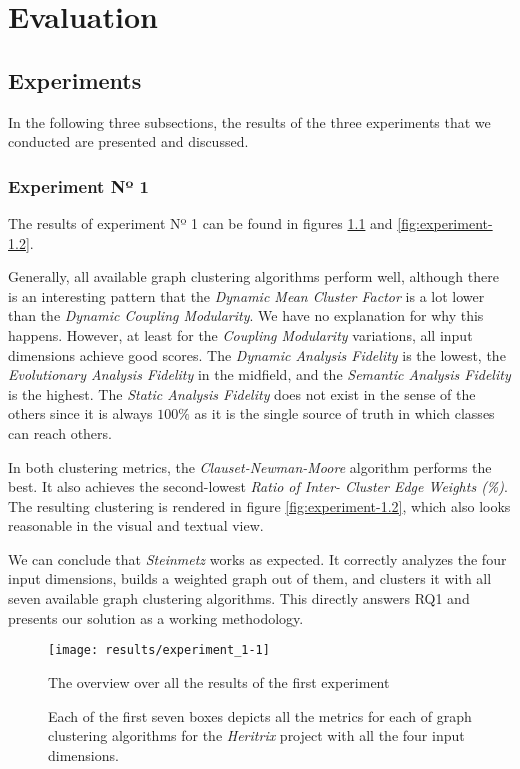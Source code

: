 \documentclass[12pt,a4paper]{report}
\begin{document}
\chapter{Evaluation} \label{chap:evaluation}

\section{Experiments}

In the following three subsections, the results of the three experiments that
we conducted are presented and discussed.


\subsection{Experiment Nº 1}

The results of experiment Nº 1 can be found in figures \ref{fig:experiment-1.1}
and \ref{fig:experiment-1.2}.

Generally, all available graph clustering algorithms perform well, although
there is an interesting pattern that the \textit{Dynamic Mean Cluster Factor}
is a lot lower than the \textit{Dynamic Coupling Modularity}. We have no
explanation for why this happens. However, at least for the \textit{Coupling
Modularity} variations, all input dimensions achieve good scores. The \textit{
Dynamic Analysis Fidelity} is the lowest, the \textit{Evolutionary Analysis
Fidelity} in the midfield, and the \textit{Semantic Analysis Fidelity} is the
highest. The \textit{Static Analysis Fidelity} does not exist in the sense of
the others since it is always $100\%$ as it is the single source of truth in
which classes can reach others.

In both clustering metrics, the \textit{Clauset-Newman-Moore} algorithm
performs the best. It also achieves the second-lowest
\textit{Ratio of Inter- Cluster Edge Weights (\%)}.
The resulting clustering is rendered in figure \ref{fig:experiment-1.2},
which also looks reasonable in the visual and textual view.

We can conclude that \textit{Steinmetz} works as expected. It correctly
analyzes the four input dimensions, builds a weighted graph out of them, and
clusters it with all seven available graph clustering algorithms. This directly
answers RQ1 and presents our solution as a working methodology.

\begin{figure}[htbp]
\centering
\texttt{[image: results/experiment\_1-1]}
\caption{The overview over all the results of the first experiment}
\caption*{\centering
  Each of the first seven boxes depicts all the metrics for each of graph clustering algorithms for the \textit{Heritrix} project with all the four input dimensions.
}
\label{fig:experiment-1.1}
\end{figure}
\end{document}
